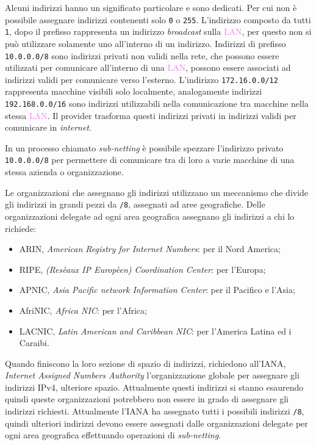 \documentclass{article}
\numberwithin{equation}{subsection}
\begin{document}
Alcuni indirizzi hanno un significato particolare e sono dedicati. Per cui non è possibile assegnare indirizzi contenenti solo \texttt{0} o \texttt{255}. L'indirizzo composto da tutti \texttt{1}, dopo il prefisso rappresenta un indirizzo \textit{broadcast} sulla \textcolor{violet}{LAN}, per questo non 
si può utilizzare solamente uno all'interno di un indirizzo. 
Indirizzi di prefisso \texttt{10.0.0.0/8} sono indirizzi privati non validi nella rete, che possono essere utilizzati per comunicare all'interno di una \textcolor{violet}{LAN}, possono essere 
associati ad indirizzi validi per comunicare verso l'esterno. 
L'indirizzo \texttt{172.16.0.0/12} rappresenta macchine visibili solo localmente, analogamente indirizzi \texttt{192.168.0.0/16} sono indirizzi utilizzabili nella comunicazione tra 
macchine nella stessa \textcolor{violet}{LAN}. Il provider trasforma questi indirizzi privati in indirizzi validi per comunicare in \textit{internet}.

In un processo chiamato \textit{sub-netting} è possibile spezzare l'indirizzo privato \texttt{10.0.0.0/8} per permettere di comunicare tra di loro a varie macchine di una stessa azienda 
o organizzazione. 

Le organizzazioni che assegnano gli indirizzi utilizzano un meccanismo che divide gli indirizzi in grandi pezzi da \texttt{/8}, assegnati ad aree geografiche. Delle organizzazioni 
delegate ad ogni area geografica assegnano gli indirizzi a chi lo richiede:
\begin{itemize}
    \item ARIN, \textit{American Registry for Internet Numbers}: per il Nord America;
    \item RIPE, \textit{(Resèaux IP Europèen) Coordination Center}: per l'Europa;
    \item APNIC, \textit{Asia Pacific network Information Center}: per il Pacifico e l'Asia;
    \item AfriNIC, \textit{Africa NIC}: per l'Africa;
    \item LACNIC, \textit{Latin American and Caribbean NIC}: per l'America Latina ed i Caraibi. 
\end{itemize}

Quando finiscono la loro sezione di spazio di indirizzi, richiedono all'IANA, \textit{Internet Assigned Numbers Authority} 
l'organizzazione globale per assegnare gli indirizzi \textcolor{BurntOrange}{IPv4}, ulteriore spazio. 
Attualmente questi indirizzi si stanno esaurendo quindi queste organizzazioni potrebbero non essere in grado di assegnare gli indirizzi richiesti. Attualmente l'IANA ha assegnato tutti i possibili indirizzi \texttt{/8}, quindi ulteriori indirizzi devono essere assegnati dalle organizzazioni delegate per ogni area geografica effettuando operazioni di \textit{sub-netting}. 
\end{document}
